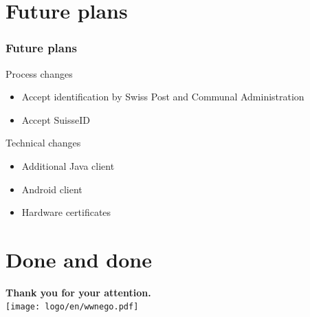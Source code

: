 \documentclass[aspectratio=1610, compress, bigger]{beamer}
\begin{document}
\section{Future plans}
\begin{frame}\frametitle{Future plans}

\begin{block}{Process changes}
\begin{itemize}
\item Accept identification by Swiss Post and Communal Administration
\item Accept SuisseID
\end{itemize}
\end{block}

\pause

\begin{block}{Technical changes}
\begin{itemize}
\item Additional Java client
\item Android client
\item Hardware certificates
\end{itemize}
\end{block}

\end{frame}

\section{Done and done}
\begin{frame}
\begin{center}
\Large{\textbf{Thank you for your attention.}} \\
\vspace{1cm}
\texttt{[image: logo/en/wwnego.pdf]}
\end{center}
\end{frame}
\end{document}
